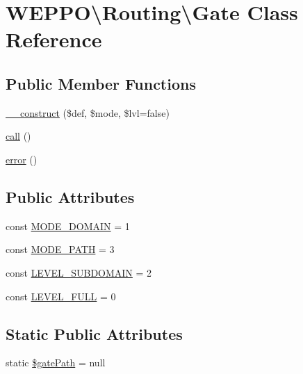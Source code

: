 \hypertarget{classWEPPO_1_1Routing_1_1Gate}{}\section{W\+E\+P\+PO\textbackslash{}Routing\textbackslash{}Gate Class Reference}
\label{classWEPPO_1_1Routing_1_1Gate}
\subsection*{Public Member Functions}
\begin{DoxyCompactItemize}
\item 
\hyperlink{classWEPPO_1_1Routing_1_1Gate_a7ffa4bb1abb78f057c2c27797e968fee}{\+\_\+\+\_\+construct} (\$def, \$mode, \$lvl=false)
\item 
\hyperlink{classWEPPO_1_1Routing_1_1Gate_a1084a2aa3302bbee0e5f7394f6b1e4e1}{call} ()
\item 
\hyperlink{classWEPPO_1_1Routing_1_1Gate_ae58398e36df9f7a9c64643c94a1b910b}{error} ()
\end{DoxyCompactItemize}
\subsection*{Public Attributes}
\begin{DoxyCompactItemize}
\item 
const \hyperlink{classWEPPO_1_1Routing_1_1Gate_ace0b76502180ef1c36c4bf157a8e940d}{M\+O\+D\+E\+\_\+\+D\+O\+M\+A\+IN} = 1
\item 
const \hyperlink{classWEPPO_1_1Routing_1_1Gate_abc68289168d1451768d390fad7435e75}{M\+O\+D\+E\+\_\+\+P\+A\+TH} = 3
\item 
const \hyperlink{classWEPPO_1_1Routing_1_1Gate_a64916c1484e8d22de9b9371e42e345a0}{L\+E\+V\+E\+L\+\_\+\+S\+U\+B\+D\+O\+M\+A\+IN} = 2
\item 
const \hyperlink{classWEPPO_1_1Routing_1_1Gate_a24835577fd5362264520625cd0fa358e}{L\+E\+V\+E\+L\+\_\+\+F\+U\+LL} = 0
\end{DoxyCompactItemize}
\subsection*{Static Public Attributes}
\begin{DoxyCompactItemize}
\item 
static \hyperlink{classWEPPO_1_1Routing_1_1Gate_a294a04242d8cf46b9542097105c19477}{\$gate\+Path} = null
\end{DoxyCompactItemize}
